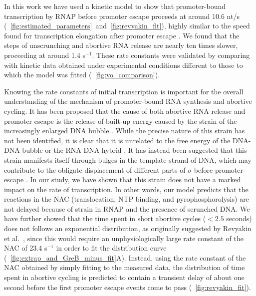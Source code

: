 %
In this work we have used a kinetic model to show that promoter-bound
transcription by RNAP before promoter escape proceeds at around 10.6 nt/s
(\FIGS~\ref{fig:estimated_parameters}~and~\ref{fig:revyakin_fit}), highly
similar to the speed found for transcription elongation after promoter
escape \cite{revyakin_abortive_2006}. We found that the steps of unscrunching
and abortive RNA release are nearly ten times slower, proceeding at around 1.4
s$^{-1}$. These rate constants were validated by comparing with kinetic data
obtained under experimental conditions different to those to which the model
was fitted (\FIG~\ref{fig:vo_comparison}).

Knowing the rate constants of initial transcription is important for the overall
understanding of the mechanism of promoter-bound RNA synthesis and abortive
cycling. It has been proposed that the cause of both abortive RNA release and
promoter escape is the release of built-up energy caused by the strain of the
increasingly enlarged DNA bubble \cite{straney_stressed_1987,
hsu_promoter_2002, revyakin_abortive_2006}. While the precise nature of this
strain has not been identified, it is clear that it is unrelated to the free
energy of the DNA-DNA bubble or the RNA-DNA hybrid \cite{hsu_initial_2006,
skancke_sequence-dependent_2015}. It has instead been suggested that this
strain manifests itself through bulges in the template-strand of DNA, which
may contribute to the obligate displacement of different parts of $\sigma$
before promoter escape \cite{winkelman_crosslink_2015}. In our study, we have
shown that this strain does not have a marked impact on the rate of
transcription. In other words, our model predicts that the reactions in the
NAC (translocation, NTP binding, and pyrophosphorolysis) are not delayed
because of strain in RNAP and the presence of scrunched DNA. We have further
showed that the time spent in short abortive cycles ($< 2.5$ seconds) does not
follows an exponential distribution, as originally suggested by Revyakin et
al.\ \cite{revyakin_abortive_2006}, since this would require an
unphysiologically large rate constant of the NAC of 23.4 s$^{-1}$ in order to
fit the distribution curve (\FIG~\ref{fig:extrap_and_GreB_minus_fit}A).
Instead, using the rate constant of the NAC obtained by simply fitting to the
measured data, the distribution of time spent in abortive cycling is predicted
to contain a transient delay of about one second before the first promoter
escape events come to pass (\FIG~\ref{fig:revyakin_fit}).

